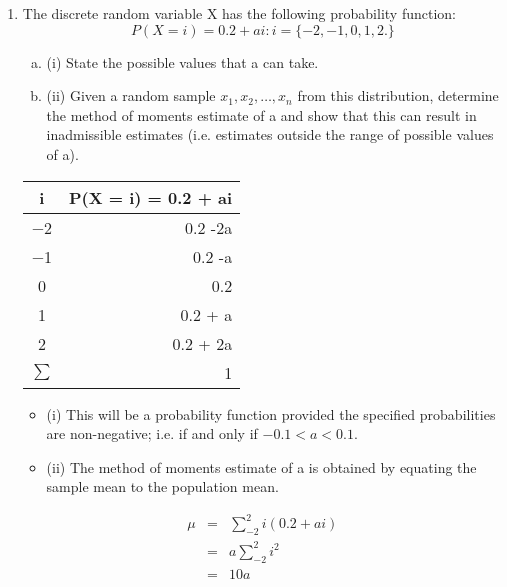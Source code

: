 \documentclass[a4paper,12pt]{article}
\begin{document}
\begin{enumerate}
\item The discrete random variable X has the following probability function:
\[P(X = i) = 0.2 + ai : i = \{-2, -1, 0, 1, 2.\}\]

\begin{enumerate}[(a)]
\item (i) State the possible values that a can take. 
\item (ii) Given a random sample $x_1 , x_2 , \ldots , x_n$ from this distribution, determine
the method of moments estimate of a and show that this can result in
inadmissible estimates (i.e. estimates outside the range of possible
values of a). 
\end{enumerate}


\begin{center}
\begin{tabular}{|c|r|}
i & P(X = i) = 0.2 + ai  \\ \hline
−2 &   0.2 -2a\\ \hline
−1 &   0.2 -a\\ \hline
0  &  0.2 \\ \hline
1  &  0.2  + a\\ \hline
2  &  0.2 + 2a\\ \hline \hline
$\sum$ & 1 \\ \hline
\end{tabular}
\end{center}
\begin{itemize} 
\item (i) This will be a probability function provided the specified probabilities are
non-negative; i.e. if and only if $-0.1 < a < 0.1$.
\item (ii) The method of moments estimate of a is obtained by equating the sample
mean to the population mean. 

\end{itemize}



\begin{eqnarray*} 
\mu &=& \sum^{2}_{-2} i(0.2 + ai) \\
&=& a \sum^{2}_{-2} i^2 \\
&=& 10a \\
\end{eqnarray*}



\end{enumerate}
\end{document}
